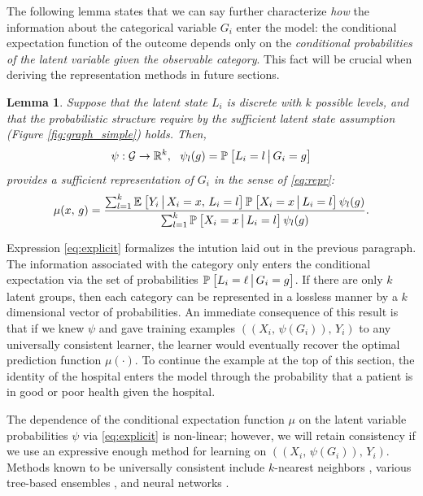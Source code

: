 \documentclass{article}
\theoremstyle{plain}
\newtheorem{lemm}[prop]{Lemma}
\theoremstyle{definition}
\theoremstyle{remark}
\begin{document}
The following lemma states that we can say further characterize \emph{how} the information about the categorical variable $G_{i}$ enter the model: the conditional expectation function of the outcome depends only on the \emph{conditional probabilities of the latent variable given the observable category}. This fact will be crucial when deriving the representation methods in future sections.

\begin{lemm}
\label{lemm:repr}
Suppose that the latent state $L_i$ is discrete with $k$ possible levels, and that the probabilistic structure require by the sufficient latent state assumption (Figure \ref{fig:graph_simple}) holds. Then,
\begin{equation}
\label{eq:psi}
\psi: \mathcal{G} \rightarrow \mathbb{R}^k, \ \ \psi_l(g) = \mathbb{P}_{}\left[L_i = l \,\big|\, G_i = g\right]
\end{equation}
provides a sufficient representation of $G_i$ in the sense of \eqref{eq:repr}:
\begin{equation}
\label{eq:explicit}
\mu(x, \, g) = \frac{\sum_{l = 1}^k  \mathbb{E}_{}\left[Y_i \,\big|\, X_i = x, \, L_i = l\right] \mathbb{P}_{}\left[X_i = x \,\big|\, L_i = l\right] \psi_l(g)}{\sum_{l = 1}^k \mathbb{P}_{}\left[X_i = x \,\big|\, L_i = l\right] \psi_l(g)}.
\end{equation}
\end{lemm}

Expression \eqref{eq:explicit} formalizes the intution laid out in the previous paragraph. The information associated with the category only enters the conditional expectation via the set of probabilities $\mathbb{P}_{}\left[L_{i} = \ell \,\big|\, G_{i} = g\right]$. If there are only $k$ latent groups, then each category can be represented in a lossless manner by a $k$ dimensional vector of probabilities. An immediate consequence of this result is that if we knew $\psi$ and gave training examples $((X_i, \, \psi(G_i)), \, Y_i)$ to any universally consistent learner, the learner would eventually recover the optimal prediction function $\mu(\cdot)$. To continue the example at the top of this section, the identity of the hospital enters the model through the probability that a patient is in good or poor health given the hospital.

The dependence of the conditional expectation function $\mu$ on the latent variable probabilities $\psi$ via \eqref{eq:explicit} is non-linear; however, we will retain consistency if we use an expressive enough method for learning on $((X_i, \, \psi(G_i)), \, Y_i)$. Methods known to be universally consistent include $k$-nearest neighbors \citep{stone1977consistent}, various tree-based ensembles \citep{biau2008consistency}, and neural networks \citep{farago1993strong}.
\end{document}
